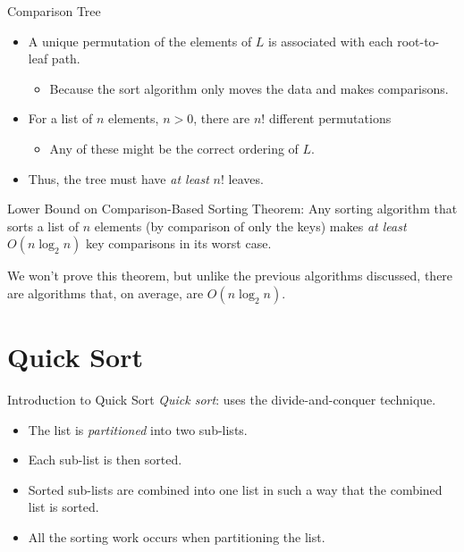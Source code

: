 \documentclass[14pt,aspectratio=1610]{beamer}
\begin{document}
\begin{frame}{Comparison Tree}
\begin{itemize}
\item<+->
  A unique permutation of the elements of $L$ is associated with each root-to-leaf path.
  \begin{itemize}
  \item
    Because the sort algorithm only moves the data and makes comparisons.
  \end{itemize}
\item<+->
  For a list of $n$ elements, $n > 0$, there are $n!$ different permutations
  \begin{itemize}
  \item
    Any of these might be the correct ordering of $L$.
  \end{itemize}
\item<+->
  Thus, the tree must have \emph{at least} $n!$ leaves.
\end{itemize}
\end{frame}

\begin{frame}{Lower Bound on Comparison-Based Sorting}
\large
Theorem: Any sorting algorithm that sorts a list of $n$ elements (by comparison of only the keys) makes \emph{at least} $O(n\log_2n)$ key comparisons in its worst case.\vspace{1em}

\pause{}
We won't prove this theorem, but unlike the previous algorithms discussed, there are algorithms that, on average, are $O(n\log_2n)$.
\end{frame}

\section{Quick Sort}

\begin{frame}{Introduction to Quick Sort}
\emph{Quick sort}: uses the divide-and-conquer technique.

\begin{itemize}
\item
  The list is \textit{partitioned} into two sub-lists.
\item
  Each sub-list is then sorted.
\item
  Sorted sub-lists are combined into one list in such a way that the combined
  list is sorted.
\item
  All the sorting work occurs when partitioning the list.
\end{itemize}
\end{frame}
\end{document}

